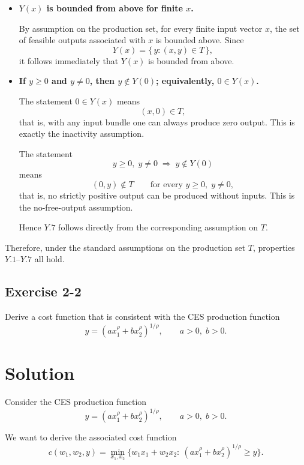 \begin{itemize}
\item[(Y.6)] \textbf{\(Y(x)\) is bounded from above for finite \(x\).}

By assumption on the production set, for every finite input vector \(x\), the set of feasible outputs associated with \(x\) is bounded above. Since
\[
Y(x)=\{\,y:(x,y)\in T\,\},
\]
it follows immediately that \(Y(x)\) is bounded from above.

\item[(Y.7)] \textbf{If \(y\ge 0\) and \(y\neq 0\), then \(y\notin Y(0)\); equivalently, \(0\in Y(x)\).}

The statement \(0\in Y(x)\) means
\[
(x,0)\in T,
\]
that is, with any input bundle one can always produce zero output. This is exactly the inactivity assumption.

The statement
\[
y\ge 0,\; y\neq 0 \;\Rightarrow\; y\notin Y(0)
\]
means
\[
(0,y)\notin T \qquad \text{for every } y\ge 0,\; y\neq 0,
\]
that is, no strictly positive output can be produced without inputs. This is the no-free-output assumption.

Hence \(Y.7\) follows directly from the corresponding assumption on \(T\).
\end{itemize}

Therefore, under the standard assumptions on the production set \(T\), properties \(Y.1\)--\(Y.7\) all hold.



\vspace{30pt}
\begin{tcolorbox}[breakable]

\subsection*{Exercise 2-2}

Derive a cost function that is consistent with the CES production function
\[
y = \left(a x_1^{\rho} + b x_2^{\rho}\right)^{1/\rho},
\qquad a>0,\; b>0.
\]

\end{tcolorbox}


\section*{Solution}

Consider the CES production function
\[
y=\left(a x_1^{\rho}+b x_2^{\rho}\right)^{1/\rho},
\qquad a>0,\; b>0.
\]

We want to derive the associated cost function
\[
c(w_1,w_2,y)=\min_{x_1,x_2}\{w_1x_1+w_2x_2:\ (a x_1^\rho+b x_2^\rho)^{1/\rho}\ge y\}.
\]

